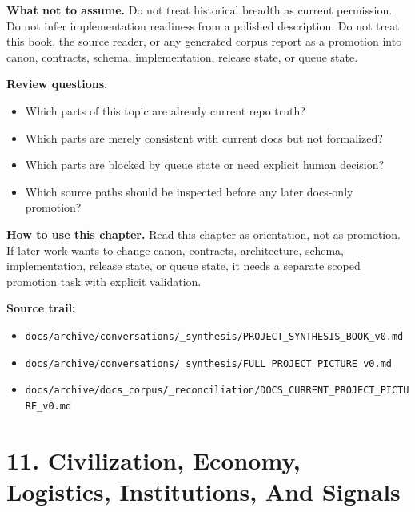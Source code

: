 \documentclass[10.5pt,a4paper,openany]{book}
\begin{document}
\textbf{What not to assume.} Do not treat historical breadth as current permission.\allowbreak{} Do not infer implementation readiness from a polished description.\allowbreak{} Do not treat this book, the source reader, or any generated corpus report as a promotion into canon, contracts, schema, implementation, release state, or queue state.\allowbreak{}


\textbf{Review questions.}


\begin{itemize}
\item Which parts of this topic are already current repo truth?
\item Which parts are merely consistent with current docs but not formalized?
\item Which parts are blocked by queue state or need explicit human decision?
\item Which source paths should be inspected before any later docs-\allowbreak{}only promotion?
\end{itemize}

\textbf{How to use this chapter.} Read this chapter as orientation, not as promotion.\allowbreak{} If later work wants to change canon, contracts, architecture, schema, implementation, release state, or queue state, it needs a separate scoped promotion task with explicit validation.\allowbreak{}


\textbf{Source trail:}


\begin{itemize}
\item \texttt{docs/\allowbreak{}archive/\allowbreak{}conversations/\allowbreak{}\_\allowbreak{}synthesis/\allowbreak{}PROJECT\_\allowbreak{}SYNTHESIS\_\allowbreak{}BOOK\_\allowbreak{}v0.\allowbreak{}md}
\item \texttt{docs/\allowbreak{}archive/\allowbreak{}conversations/\allowbreak{}\_\allowbreak{}synthesis/\allowbreak{}FULL\_\allowbreak{}PROJECT\_\allowbreak{}PICTURE\_\allowbreak{}v0.\allowbreak{}md}
\item \texttt{docs/\allowbreak{}archive/\allowbreak{}docs\_\allowbreak{}corpus/\allowbreak{}\_\allowbreak{}reconciliation/\allowbreak{}DOCS\_\allowbreak{}CURRENT\_\allowbreak{}PROJECT\_\allowbreak{}PICTURE\_\allowbreak{}v0.\allowbreak{}md}
\end{itemize}


\section{11. Civilization, Economy, Logistics, Institutions, And Signals}
\end{document}
